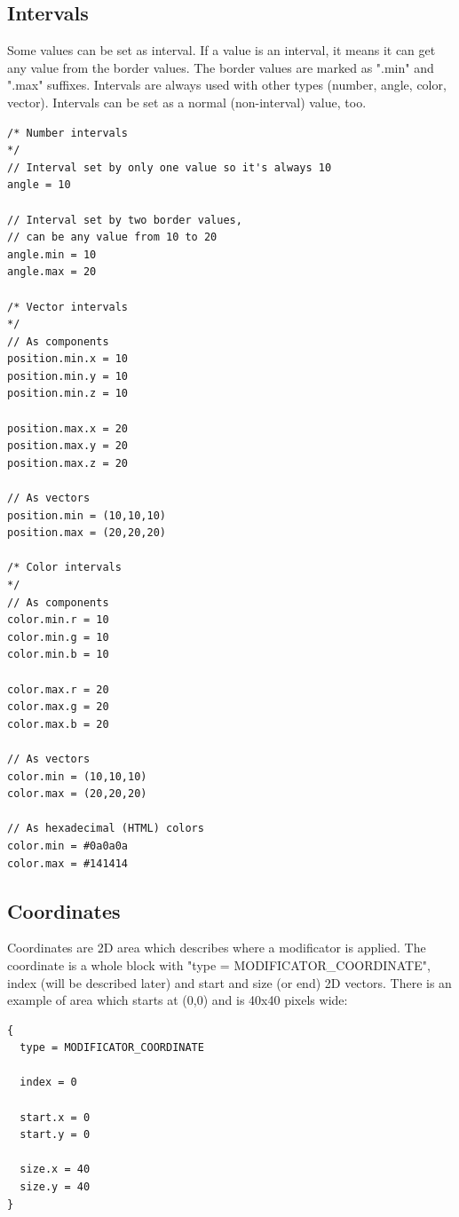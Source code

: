 \documentclass[9pt]{article}
\begin{document}
\subsection{Intervals}
Some values can be set as interval. If a value is an interval,
it means it can get any value from the border values. The border values
are marked as ".min" and ".max" suffixes. Intervals are always used
with other types (number, angle, color, vector). Intervals can be set 
as a normal (non-interval) value, too.
\begin{verbatim}
/* Number intervals
*/
// Interval set by only one value so it's always 10
angle = 10

// Interval set by two border values, 
// can be any value from 10 to 20
angle.min = 10
angle.max = 20 

/* Vector intervals
*/ 
// As components
position.min.x = 10
position.min.y = 10
position.min.z = 10

position.max.x = 20
position.max.y = 20
position.max.z = 20

// As vectors
position.min = (10,10,10)
position.max = (20,20,20)

/* Color intervals
*/
// As components
color.min.r = 10
color.min.g = 10
color.min.b = 10

color.max.r = 20
color.max.g = 20
color.max.b = 20

// As vectors
color.min = (10,10,10)
color.max = (20,20,20)

// As hexadecimal (HTML) colors
color.min = #0a0a0a
color.max = #141414
\end{verbatim}

\subsection{Coordinates}
Coordinates are 2D area which describes 
where a modificator is applied. The coordinate is a whole 
block with "type = MODIFICATOR\_COORDINATE", index (will be described later)
and start and size (or end) 2D vectors. There is an example of area
which starts at (0,0) and is 40x40 pixels wide:
\begin{verbatim}
{
  type = MODIFICATOR_COORDINATE

  index = 0

  start.x = 0
  start.y = 0

  size.x = 40
  size.y = 40
}
\end{verbatim}
\end{document}
